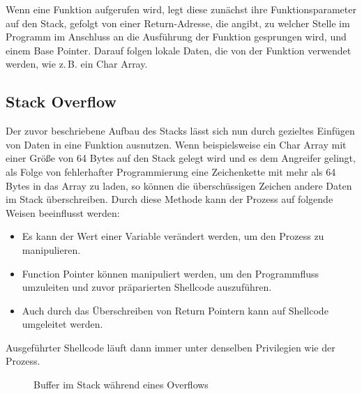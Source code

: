 Wenn eine Funktion aufgerufen wird, legt diese zunächst ihre Funktionsparameter auf den Stack,
gefolgt von einer Return-Adresse, die angibt, zu welcher Stelle im Programm im Anschluss an die
Ausführung der Funktion gesprungen wird, und einem Base Pointer. Darauf folgen lokale Daten,
die von der Funktion verwendet werden, wie z.\,B. ein Char Array.
\pagebreak
\subsection{Stack Overflow}
Der zuvor beschriebene Aufbau des Stacks lässt sich nun durch gezieltes Einfügen von Daten in eine Funktion ausnutzen.
Wenn beispielsweise ein Char Array mit einer Größe von 64 Bytes auf den Stack gelegt wird und es dem Angreifer gelingt,
als Folge von fehlerhafter Programmierung eine Zeichenkette mit mehr als 64 Bytes in das Array zu laden, so können
die überschüssigen Zeichen andere Daten im Stack überschreiben. Durch diese Methode kann der Prozess auf folgende
Weisen beeinflusst werden:
\begin{itemize}
    \item Es kann der Wert einer Variable verändert werden, um den Prozess zu manipulieren.
    \item Function Pointer können manipuliert werden, um den Programmfluss umzuleiten und zuvor präparierten Shellcode auszuführen.
    \item Auch durch das Überschreiben von Return Pointern kann auf Shellcode umgeleitet werden.
\end{itemize}

Ausgeführter Shellcode läuft dann immer unter denselben Privilegien wie der Prozess.
\begin{figure}[h]%
    \centering
    \qquad
    \caption{Buffer im Stack während eines Overflows}%
    \label{fig:example}%
\end{figure}

